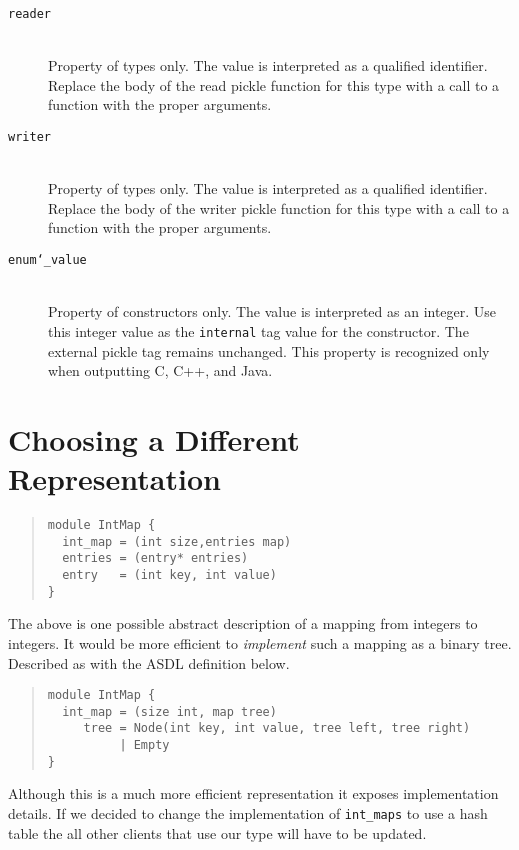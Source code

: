 \begin{description}
  \item[\texttt{reader}]\mbox{}\\
   Property of types only. The value is interpreted as a qualified
   identifier.  Replace the body of the read pickle function for this
   type with a call to a function with the proper arguments. 

  \item[\texttt{writer}]\mbox{}\\
   Property of types only. The value is interpreted as a qualified
   identifier.  Replace the body of the writer pickle function for this
   type with a call to a function with the proper arguments. 

  \item[\texttt{enum\char`\_value}]\mbox{}\\
   Property of constructors only. The value is interpreted as an integer.
   Use this integer value as the \lstinline!internal! tag value for the
   constructor. The external pickle tag remains unchanged. 
   This property is recognized only when outputting C, C++, and Java. 

\end{description}%

\section{Choosing a Different Representation}

\begin{quote}\begin{lstlisting}[language=ASDL]
module IntMap {
  int_map = (int size,entries map)
  entries = (entry* entries)
  entry   = (int key, int value)
}
\end{lstlisting}\end{quote}%
The above is one possible abstract description of a mapping from integers to
integers.  It would be more efficient to \emph{implement} such a mapping as
a binary tree. Described as with the ASDL definition below.
\begin{quote}\begin{lstlisting}[language=ASDL]
module IntMap {
  int_map = (size int, map tree)
     tree = Node(int key, int value, tree left, tree right)
          | Empty
}
\end{lstlisting}\end{quote}%

Although this is a much more efficient representation it exposes
implementation details. If we decided to change the implementation of
\lstinline!int_maps! to use a hash table the all other clients that use our type
will have to be updated.

